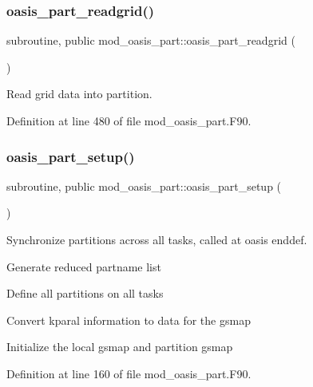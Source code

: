 \subsubsection{\texorpdfstring{oasis\+\_\+part\+\_\+readgrid()}{oasis\_part\_readgrid()}}
{\footnotesize\ttfamily subroutine, public mod\+\_\+oasis\+\_\+part\+::oasis\+\_\+part\+\_\+readgrid (\begin{DoxyParamCaption}{ }\end{DoxyParamCaption})}



Read grid data into partition. 



Definition at line 480 of file mod\+\_\+oasis\+\_\+part.\+F90.

\mbox{\label{namespacemod__oasis__part_a80f66cc0ce5857aa53d070861f05b521}} 
\subsubsection{\texorpdfstring{oasis\+\_\+part\+\_\+setup()}{oasis\_part\_setup()}}
{\footnotesize\ttfamily subroutine, public mod\+\_\+oasis\+\_\+part\+::oasis\+\_\+part\+\_\+setup (\begin{DoxyParamCaption}{ }\end{DoxyParamCaption})}



Synchronize partitions across all tasks, called at oasis enddef. 


\begin{DoxyItemize}
\item Generate reduced partname list
\item Define all partitions on all tasks
\item Convert kparal information to data for the gsmap
\item Initialize the local gsmap and partition gsmap 
\end{DoxyItemize}

Definition at line 160 of file mod\+\_\+oasis\+\_\+part.\+F90.

\mbox{\label{namespacemod__oasis__part_a12edb4b0248a3f562fe5f6e16eede06a}} 
